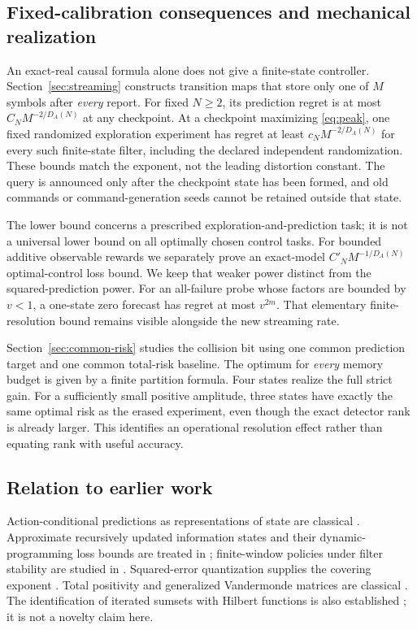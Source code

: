 \subsection{Fixed-calibration consequences and mechanical realization}
An exact-real causal formula alone does not give a finite-state controller.
Section~\ref{sec:streaming} constructs transition maps that store only one
of $M$ symbols after \emph{every} report. For fixed $N\ge2$, its prediction
regret is at most $C_NM^{-2/D_A(N)}$ at any checkpoint. At a checkpoint
maximizing \eqref{eq:peak}, one fixed randomized exploration experiment
has regret at least $c_NM^{-2/D_A(N)}$ for every such finite-state filter,
including the declared independent randomization. These bounds match the
exponent, not the leading distortion constant. The query is announced
only after the checkpoint state has been formed, and old commands or
command-generation seeds cannot be retained outside that state.

The lower bound concerns a prescribed exploration-and-prediction task;
it is not a universal lower bound on all optimally chosen control tasks.
For bounded additive observable rewards we separately prove an exact-model
$C'_NM^{-1/D_A(N)}$ optimal-control loss bound. We keep that weaker
power distinct from the squared-prediction power. For an all-failure probe
whose factors are bounded by $v<1$, a one-state zero forecast has regret
at most $v^{2m}$. That elementary finite-resolution bound remains visible
alongside the new streaming rate.

Section~\ref{sec:common-risk} studies the collision bit using one common
prediction target and one common total-risk baseline. The optimum for
\emph{every} memory budget is given by a finite partition formula. Four
states realize the full strict gain. For a sufficiently small positive
amplitude, three states have exactly the same optimal risk as the erased
experiment, even though the exact detector rank is already larger. This
identifies an operational resolution effect rather than equating rank with
useful accuracy.

\subsection{Relation to earlier work}
Action-conditional predictions as representations of state are classical
\cite{LittmanSutton}. Approximate recursively updated information states
and their dynamic-programming loss bounds are treated in
\cite{Subramanian}; finite-window policies under filter stability are
studied in \cite{KaraYuksel}. Squared-error quantization supplies the
covering exponent \cite{GrafLuschgy}. Total positivity and generalized
Vandermonde matrices are classical \cite{Pinkus}. The identification of
iterated sumsets with Hilbert functions is also established
\cite{EliahouMazumdar,Elias}; it is not a novelty claim here.

